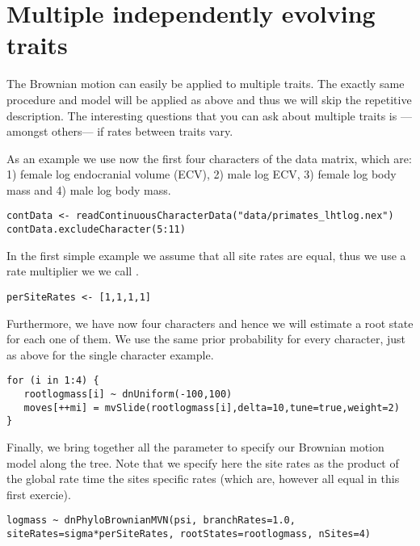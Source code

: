 \vspace{5cm}


\section{Multiple independently evolving traits}
The Brownian motion can easily be applied to multiple traits. The exactly same procedure and model will be applied as above and thus we will skip the repetitive description. The interesting questions that you can ask about multiple traits is ---amongst others--- if rates between traits vary.


As an example we use now the first four characters of the data matrix, which are: 1) female log endocranial volume (ECV), 2) male log ECV, 3) female log body mass and 4) male log body mass.
{\tt \small \begin{snugshade*}
\begin{lstlisting}
contData <- readContinuousCharacterData("data/primates_lhtlog.nex")
contData.excludeCharacter(5:11)
\end{lstlisting}
\end{snugshade*}}
In the first simple example we assume that all site rates are equal, thus we use a rate multiplier we we call .
{\tt \small \begin{snugshade*}
\begin{lstlisting}
perSiteRates <- [1,1,1,1]
\end{lstlisting}
\end{snugshade*}}
Furthermore, we have now four characters and hence we will estimate a root state for each one of them. We use the same prior probability for every character, just as above for the single character example.
{\tt \small \begin{snugshade*}
\begin{lstlisting}
for (i in 1:4) {
   rootlogmass[i] ~ dnUniform(-100,100)
   moves[++mi] = mvSlide(rootlogmass[i],delta=10,tune=true,weight=2) 
}
\end{lstlisting}
\end{snugshade*}}

Finally, we bring together all the parameter to specify our Brownian motion model along the tree. Note that we specify here the site rates as the product of the global rate  time the sites specific rates (which are, however all equal in this first exercie).
{\tt \small \begin{snugshade*}
\begin{lstlisting}
logmass ~ dnPhyloBrownianMVN(psi, branchRates=1.0, siteRates=sigma*perSiteRates, rootStates=rootlogmass, nSites=4)
\end{lstlisting}
\end{snugshade*}}

